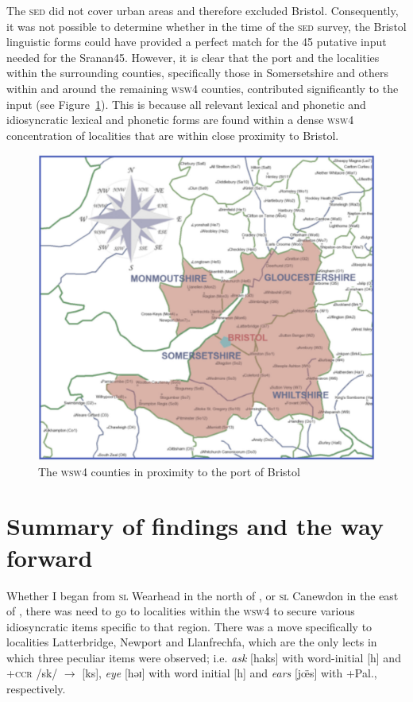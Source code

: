 The \textsc{sed} did not cover urban areas and therefore excluded Bristol. Consequently, it was not possible to determine whether in the time of the \textsc{sed} survey, the Bristol linguistic forms could have provided a perfect match for the 45 putative input needed for the Sranan45. However, it is clear that the port and the localities within the surrounding counties, specifically those in Somersetshire and others within and around the remaining \textsc{wsw4} counties, contributed significantly to the  input (see Figure~\ref{Map5.15}). This is because all relevant lexical and phonetic and idiosyncratic lexical and phonetic  forms are found within a dense \textsc{wsw4} concentration of localities that are within close proximity to Bristol.

\begin{figure}
\includegraphics[width=\textwidth] {figures/wsw4.pdf}
\addtocounter{figure}{-1}\renewcommand{\thefigure}{\arabic{figure}.15}
\caption {The \textsc{wsw4} counties in proximity to the port of Bristol}
\label{Map5.15} 
\end{figure}

\section{Summary of findings and the way forward}
Whether I began from \textsc{sl} Wearhead in the north of , or \textsc{sl} Canewdon in the east of , there was need to go to localities within the \textsc{wsw4} to secure various idiosyncratic items specific to that region. There was a move specifically to localities Latterbridge, Newport and Llanfrechfa, which are the only lects in which three peculiar items were observed; i.e. \emph{ask} [haks] with word-initial [h] and +\textsc{ccr} /sk/ $\rightarrow$ [ks], \emph{eye} [həɪ] with word initial [h] and \emph{ears} [j\"œs] with +Pal., respectively.

